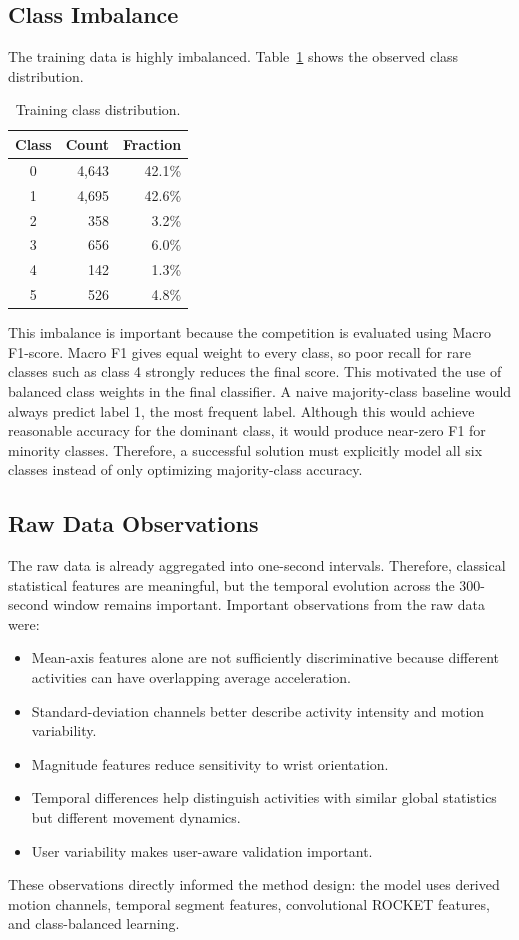 \documentclass[conference]{IEEEtran}
\begin{document}
\subsection{Class Imbalance}
The training data is highly imbalanced. Table~\ref{tab:classdist} shows the observed class distribution.
\begin{table}[!t]
\centering
\caption{Training class distribution.}
\label{tab:classdist}
\begin{tabular}{crr}
\toprule
Class & Count & Fraction \\
\midrule
0 & 4,643 & 42.1\% \\
1 & 4,695 & 42.6\% \\
2 & 358 & 3.2\% \\
3 & 656 & 6.0\% \\
4 & 142 & 1.3\% \\
5 & 526 & 4.8\% \\
\bottomrule
\end{tabular}
\end{table}
This imbalance is important because the competition is evaluated using Macro F1-score. Macro F1 gives equal weight to every class, so poor recall for rare classes such as class 4 strongly reduces the final score. This motivated the use of balanced class weights in the final classifier.
A naive majority-class baseline would always predict label 1, the most frequent label. Although this would achieve reasonable accuracy for the dominant class, it would produce near-zero F1 for minority classes. Therefore, a successful solution must explicitly model all six classes instead of only optimizing majority-class accuracy.
\subsection{Raw Data Observations}
The raw data is already aggregated into one-second intervals. Therefore, classical statistical features are meaningful, but the temporal evolution across the 300-second window remains important.
Important observations from the raw data were:
\begin{itemize}[noitemsep]
    \item Mean-axis features alone are not sufficiently discriminative because different activities can have overlapping average acceleration.
    \item Standard-deviation channels better describe activity intensity and motion variability.
    \item Magnitude features reduce sensitivity to wrist orientation.
    \item Temporal differences help distinguish activities with similar global statistics but different movement dynamics.
    \item User variability makes user-aware validation important.
\end{itemize}
These observations directly informed the method design: the model uses derived motion channels, temporal segment features, convolutional ROCKET features, and class-balanced learning.
\end{document}
